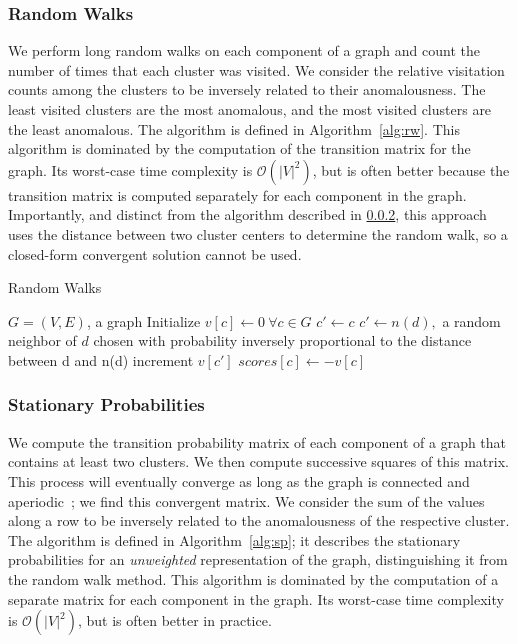 \subsubsection{Random Walks}
We perform long random walks on each component of a graph and count the number of times that each cluster was visited.
We consider the relative visitation counts among the clusters to be inversely related to their anomalousness.
The least visited clusters are the most anomalous, and the most visited clusters are the least anomalous.
The algorithm is defined in Algorithm~\ref{alg:rw}.
This algorithm is dominated by the computation of the transition matrix for the graph.
Its worst-case time complexity is $\mathcal{O}(|V|^2)$, but is often better because the transition matrix is computed separately for each component in the graph.
Importantly, and distinct from the algorithm described in \ref{subsubsec:methods:individual-algorithms:sp}, this approach uses the distance between two cluster centers to determine the random walk, so a closed-form convergent solution cannot be used.


\begin{algorithm}[h]
    \caption{Random Walks}
    \label{alg:rw}
\begin{algorithmic}[1]
    \REQUIRE $G = (V,E)$, a graph
    \STATE Initialize $v[c] \gets 0 \ \forall c \in G$
        \STATE $c' \gets c$
            \STATE $c' \gets n(d),$ a random neighbor of $d$ chosen with probability inversely proportional to the distance between d and n(d)
            \STATE increment $v[c']$
        \ENDFOR
    \ENDFOR
        \STATE $scores[c] \gets -v[c]$
    \ENDFOR
\end{algorithmic}
\end{algorithm}

\subsubsection{Stationary Probabilities}
\label{subsubsec:methods:individual-algorithms:sp}
We compute the transition probability matrix of each component of a graph that contains at least two clusters.
We then compute successive squares of this matrix.
This process will eventually converge as long as the graph is connected and aperiodic~\cite{levin2017markov}; we find this convergent matrix.
We consider the sum of the values along a row to be inversely related to the anomalousness of the respective cluster.
The algorithm is defined in Algorithm~\ref{alg:sp}; it describes the stationary probabilities for an \emph{unweighted} representation of the graph, distinguishing it from the random walk method.
This algorithm is dominated by the computation of a separate matrix for each component in the graph.
Its worst-case time complexity is $\mathcal{O}(|V|^2)$, but is often better in practice.

